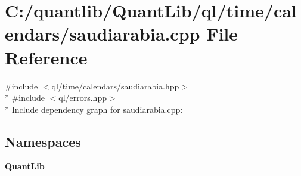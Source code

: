 \section{C\+:/quantlib/\+Quant\+Lib/ql/time/calendars/saudiarabia.cpp File Reference}
\label{saudiarabia_8cpp}
{\ttfamily \#include $<$ql/time/calendars/saudiarabia.\+hpp$>$}\\*
{\ttfamily \#include $<$ql/errors.\+hpp$>$}\\*
Include dependency graph for saudiarabia.\+cpp\+:
\subsection*{Namespaces}
\begin{DoxyCompactItemize}
\item 
 {\bf Quant\+Lib}
\end{DoxyCompactItemize}
